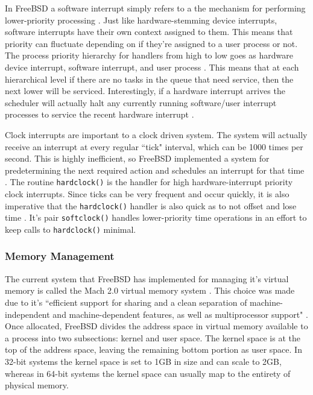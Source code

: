 \documentclass[10pt,draftclsnofoot,onecolumn]{IEEEtran}
\begin{document}
\par In FreeBSD a software interrupt simply refers to a the mechanism for performing lower-priority processing \cite{bsd:1}.
Just like hardware-stemming device interrupts, software interrupts have their own context assigned to them.
This means that priority can fluctuate depending on if they're assigned to a user process or not.
The process priority hierarchy for handlers from high to low goes as hardware device interrupt, software interrupt, and user process \cite{bsd:1}.
This means that at each hierarchical level if there are no tasks in the queue that need service, then the next lower will be serviced.
Interestingly, if a hardware interrupt arrives the scheduler will actually halt any currently running software/user interrupt processes to service the recent hardware interrupt \cite{bsd:1}.

\par Clock interrupts are important to a clock driven system.
The system will actually receive an interrupt at every regular ``tick" interval, which can be 1000 times per second.
This is highly inefficient, so FreeBSD implemented a system for predetermining the next required action and schedules an interrupt for that time \cite{bsd:1}.
The routine \texttt{hardclock()} is the handler for high hardware-interrupt priority clock interrupts.
Since ticks can be very frequent and occur quickly, it is also imperative that the \texttt{hardclock()} handler is also quick as to not offset and lose time \cite{bsd:1}.
It's pair \texttt{softclock()} handles lower-priority time operations in an effort to keep calls to \texttt{hardclock()} minimal.

\subsubsection{Memory Management}
\label{sub:Memory Management FreeBSD}
\par The current system that FreeBSD has implemented for managing it's virtual memory is called the Mach 2.0 virtual memory system \cite{bsd:1}.
This choice was made due to it's ``efficient support for sharing and a clean separation of machine-independent and machine-dependent features, as well as multiprocessor support" \cite{bsd:1}.
Once allocated, FreeBSD divides the address space in virtual memory available to a process into two subsections: kernel and user space.
The kernel space is at the top of the address space, leaving the remaining bottom portion as user space.
In 32-bit systems the kernel space is set to 1GB in size and can scale to 2GB, whereas in 64-bit systems the kernel space can usually map to the entirety of physical memory.
\end{document}
